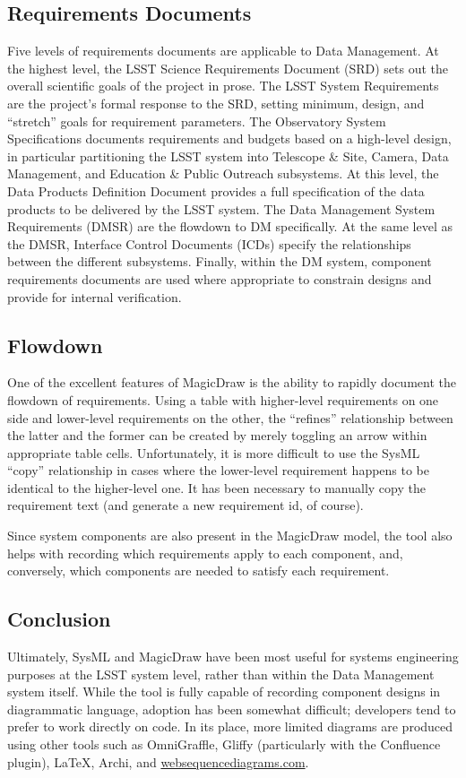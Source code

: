 \subsection{Requirements Documents}

Five levels of requirements documents are applicable to Data Management.
At the highest level, the LSST Science Requirements Document (SRD)\cite{LPM-17} sets out the overall scientific goals of the project in prose.
The LSST System Requirements\cite{LSE-29} are the project's formal response to the SRD, setting minimum, design, and ``stretch'' goals for requirement parameters.
The Observatory System Specifications\cite{LSE-30} documents requirements and budgets based on a high-level design, in particular partitioning the LSST system into Telescope \& Site, Camera, Data Management, and Education \& Public Outreach subsystems.
At this level, the Data Products Definition Document\cite{LSE-163} provides a full specification of the data products to be delivered by the LSST system.
The Data Management System Requirements (DMSR)\cite{LSE-61} are the flowdown to DM specifically.
At the same level as the DMSR, Interface Control Documents (ICDs) specify the relationships between the different subsystems.
Finally, within the DM system, component requirements documents are used where appropriate to constrain designs and provide for internal verification.

\subsection{Flowdown}

One of the excellent features of MagicDraw is the ability to rapidly document the flowdown of requirements.
Using a table with higher-level requirements on one side and lower-level requirements on the other, the ``refines'' relationship between the latter and the former can be created by merely toggling an arrow within appropriate table cells.
Unfortunately, it is more difficult to use the SysML ``copy'' relationship in cases where the lower-level requirement happens to be identical to the higher-level one.
It has been necessary to manually copy the requirement text (and generate a new requirement id, of course).

Since system components are also present in the MagicDraw model, the tool also helps with recording which requirements apply to each component, and, conversely, which components are needed to satisfy each requirement.

\subsection{Conclusion}

Ultimately, SysML and MagicDraw have been most useful for systems engineering purposes at the LSST system level, rather than within the Data Management system itself.
While the tool is fully capable of recording component designs in diagrammatic language, adoption has been somewhat difficult; developers tend to prefer to work directly on code.
In its place, more limited diagrams are produced using other tools such as OmniGraffle, Gliffy (particularly with the Confluence plugin), LaTeX, Archi, and \href{http://websequencediagrams.com}{websequencediagrams.com}.
